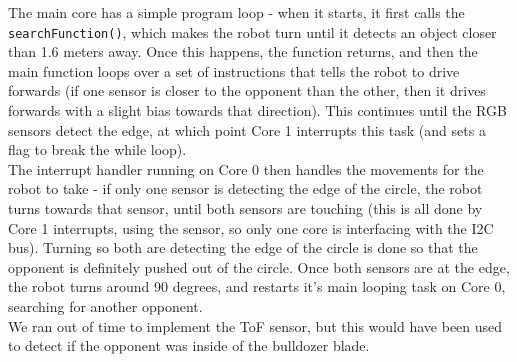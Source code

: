 \documentclass[11pt]{article}
\begin{document}
The main core has a simple program loop - when it starts, it first calls the \texttt{searchFunction()}, which makes the robot turn until it detects an object closer than 1.6 meters away.
Once this happens, the function returns, and then the main function loops over a set of instructions that tells the robot to drive forwards (if one sensor is closer to the opponent than the other, then it drives forwards with a slight bias towards that direction). This continues until the RGB sensors detect the edge, at which point Core 1 interrupts this task (and sets a flag to break the while loop).\\

The interrupt handler running on Core 0 then handles the movements for the robot to take - if only one sensor is detecting the edge of the circle, the robot turns towards that sensor, until both sensors are touching (this is all done by Core 1 interrupts, using the sensor, so only one core is interfacing with the I2C bus). Turning so both are detecting the edge of the circle is done so that the opponent is definitely pushed out of the circle. Once both sensors are at the edge, the robot turns around 90 degrees, and restarts it's main looping task on Core 0, searching for another opponent.\\

We ran out of time to implement the ToF sensor, but this would have been used to detect if the opponent was inside of the bulldozer blade.\\
\end{document}
